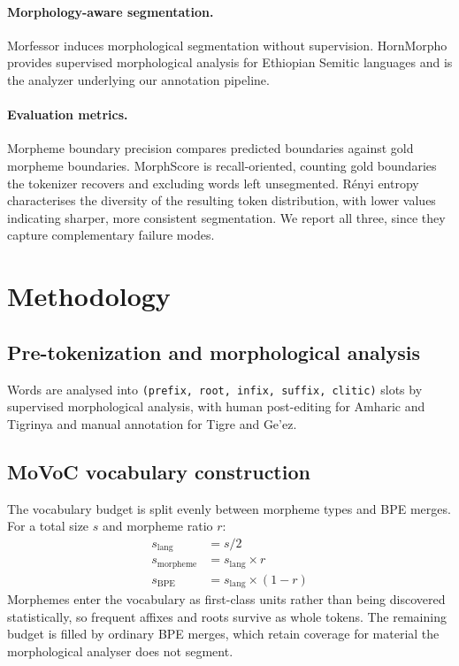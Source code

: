 \documentclass[11pt]{article}
\begin{document}
\paragraph{Morphology-aware segmentation.}
Morfessor \citep{creutz2007morfessor} induces morphological segmentation
without supervision. HornMorpho \citep{gasser2011hornmorpho} provides supervised
morphological analysis for Ethiopian Semitic languages and is the analyzer
underlying our annotation pipeline.

\paragraph{Evaluation metrics.}
Morpheme boundary precision \citep{nouri2016precision} compares predicted
boundaries against gold morpheme boundaries. MorphScore
\citep{arnett2025morphscore} is recall-oriented, counting gold boundaries the
tokenizer recovers and excluding words left unsegmented. R\'enyi entropy
\citep{renyi1961entropy} characterises the diversity of the resulting token
distribution, with lower values indicating sharper, more consistent
segmentation. We report all three, since they capture complementary failure
modes.

\section{Methodology}
\label{sec:method}

\subsection{Pre-tokenization and morphological analysis}

Words are analysed into \texttt{(prefix, root, infix, suffix, clitic)} slots by
supervised morphological analysis, with human post-editing for Amharic and
Tigrinya and manual annotation for Tigre and Ge'ez.

\subsection{MoVoC vocabulary construction}
\label{sec:movoc}

The vocabulary budget is split evenly between morpheme types and BPE merges.
For a total size $s$ and morpheme ratio $r$:
%
\begin{align}
  s_{\text{lang}}     &= s / 2 \\
  s_{\text{morpheme}} &= s_{\text{lang}} \times r \\
  s_{\text{BPE}}      &= s_{\text{lang}} \times (1 - r)
\end{align}
%
Morphemes enter the vocabulary as first-class units rather than being
discovered statistically, so frequent affixes and roots survive as whole
tokens. The remaining budget is filled by ordinary BPE merges, which retain
coverage for material the morphological analyser does not segment.
\end{document}
